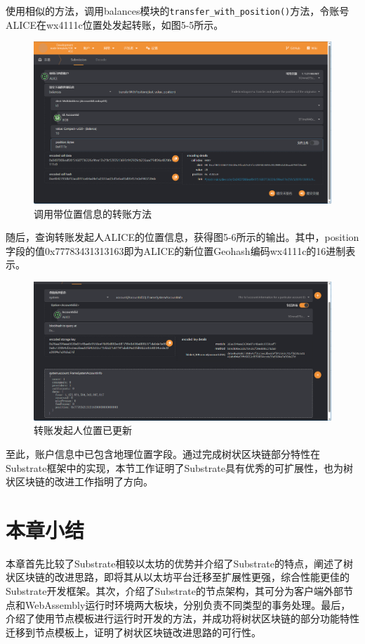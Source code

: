 使用相似的方法，调用balances模块的\verb|transfer_with_position()|方法，令账号ALICE在wx4111c位置处发起转账，如图5-5所示。

\begin{figure}[htbp]
    \centering
    \includegraphics[width=\textwidth]{images/transWithPos.png}
    \caption{调用带位置信息的转账方法}\label{调用带位置信息的转账方法} %
\end{figure}

随后，查询转账发起人ALICE的位置信息，获得图5-6所示的输出。其中，position字段的值0x77783431313163即为ALICE的新位置Geohash编码wx4111c的16进制表示。

\begin{figure}[htbp]
    \centering
    \includegraphics[width=\textwidth]{images/transWithPosResult.png}
    \caption{转账发起人位置已更新}\label{转账发起人位置已更新} %
\end{figure}

至此，账户信息中已包含地理位置字段。通过完成树状区块链部分特性在Substrate框架中的实现，本节工作证明了Substrate具有优秀的可扩展性，也为树状区块链的改进工作指明了方向。

\section{本章小结}

本章首先比较了Substrate相较以太坊的优势并介绍了Substrate的特点，阐述了树状区块链的改进思路，即将其从以太坊平台迁移至扩展性更强，综合性能更佳的Substrate开发框架。其次，介绍了Substrate的节点架构，其可分为客户端外部节点和WebAssembly运行时环境两大板块，分别负责不同类型的事务处理。最后，介绍了使用节点模板进行运行时开发的方法，并成功将树状区块链的部分功能特性迁移到节点模板上，证明了树状区块链改进思路的可行性。
